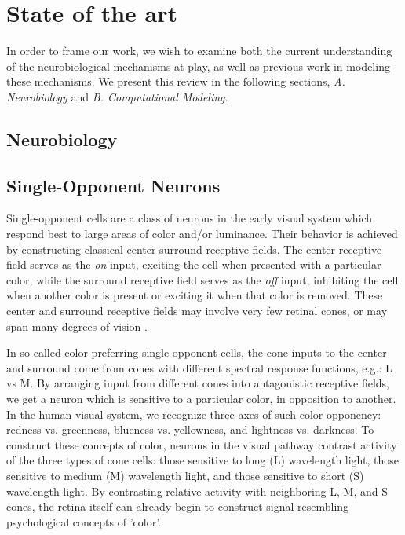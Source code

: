 \documentclass[journal,onecolumn]{IEEEtran}
\begin{document}
\section{State of the art}

In order to frame our work, we wish to examine both the current understanding of the neurobiological mechanisms at play, as well as previous work in modeling these mechanisms. We present this review in the following sections, \textit{A. Neurobiology} and \textit{B. Computational Modeling}.

\subsection{Neurobiology} \label{section:neurobiology}

\subsection*{Single-Opponent Neurons}

Single-opponent cells are a class of neurons in the early visual system which respond best to large areas of color and/or luminance. Their behavior is achieved by constructing classical center-surround receptive fields. The center receptive field serves as the \textit{on} input, exciting the cell when presented with a particular color, while the surround receptive field serves as the \textit{off} input, inhibiting the cell when another color is present or exciting it when that color is removed. These center and surround receptive fields may involve very few retinal cones, or may span many degrees of vision \cite{lennie:1991}.

In so called color preferring single-opponent cells, the cone inputs to the center and surround come from cones with different spectral response functions, e.g.: L vs M. By arranging input from different cones into antagonistic  receptive fields, we get a neuron which is sensitive to a particular color, in opposition to another. In the human visual system, we recognize three axes of such color opponency: redness vs. greenness, blueness vs. yellowness, and lightness vs. darkness. To construct these concepts of color, neurons in the visual pathway contrast activity of the three types of cone cells: those sensitive to long (L) wavelength light, those sensitive to medium (M) wavelength light, and those sensitive to short (S) wavelength light. By contrasting relative activity with neighboring L, M, and S cones, the retina itself can already begin to construct signal resembling psychological concepts of 'color'.
\end{document}

